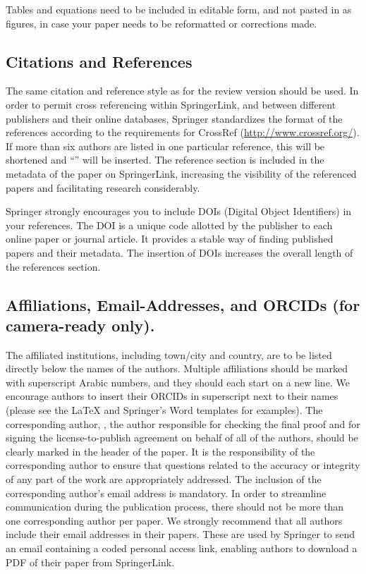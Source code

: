 \documentclass[runningheads]{llncs}
\begin{document}
Tables and equations need to be included in editable form, and not pasted in as figures, in case your paper needs to be reformatted or corrections made.


\subsection{Citations and References}
The same citation and reference style as for the review version should be used. 
In order to permit cross referencing within SpringerLink, and between different publishers and their online databases, Springer standardizes the format of the references according to the requirements for CrossRef (\url{http://www.crossref.org/}).
If more than six authors are listed in one particular reference, this will be shortened and ``\etal'' will be inserted.
The reference section is included in the metadata of the paper on SpringerLink, increasing the visibility of the referenced papers and facilitating research considerably.

Springer strongly encourages you to include DOIs (Digital Object Identifiers) in your references. 
The DOI is a unique code allotted by the publisher to each online paper or journal article. 
It provides a stable way of finding published papers and their metadata. 
The insertion of DOIs increases the overall length of the references section.


\subsection{Affiliations, Email-Addresses, and ORCIDs (for camera-ready only).}
The affiliated institutions, including town/city and country, are to be listed directly below the names of the authors.
Multiple affiliations should be marked with superscript Arabic numbers, and they should each start on a new line. 
We encourage authors to insert their ORCIDs in superscript next to their names (please see the \LaTeX{} and Springer's Word templates for examples).
The corresponding author, \ie, the author responsible for checking the final proof and for signing the license-to-publish agreement on behalf of all of the authors, should be clearly marked in the header of the paper. 
It is the responsibility of the corresponding author to ensure that questions related to the accuracy or integrity of any part of the work are appropriately addressed. 
The inclusion of the corresponding author’s email address is mandatory. 
In order to streamline communication during the publication process, there should not be more than one corresponding author per paper.
We strongly recommend that all authors include their email addresses in their papers. 
These are used by Springer to send an email containing a coded personal access link, enabling authors to download a PDF of their paper from SpringerLink.
\end{document}
